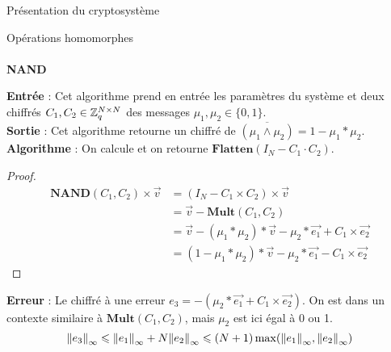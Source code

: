 \begin{section}{Présentation du cryptosystème}
\begin{subsection}{Opérations homomorphes}
	\paragraph{}
	\textbf{NAND}
	\flushleft
	
	\textbf{Entrée} : Cet algorithme prend en entrée les paramètres du système et deux chiffrés $C_1, C_2 \in \mathbb{Z}_q^{N \times N}$ des messages $\mu_1, \mu_2 \in \{ 0,1\}$.\\
	\textbf{Sortie} : Cet algorithme retourne un chiffré de $\overline{(\mu_1 \land \mu_2)} = 1 - \mu_1 * \mu_2$. \\
	\textbf{Algorithme} : On calcule et on retourne $\textbf{Flatten}(I_N - C_1 \cdot C_2)$.
	\begin{proof}
	\begin{align*}
	\textbf{NAND}(C_1, C_2) \times \vec{v} &= (I_N - C_1 \times C_2) \times \vec{v} \\
	&= \vec{v} - \textbf{Mult}(C_1, C_2) \\
	&= \vec{v} - (\mu_1 * \mu_2) * \vec{v} - \mu_2 * \vec{e_1} + C_1 \times \vec{e_2} \\
	&= (1 - \mu_1 * \mu_2) * \vec{v} - \mu_2 * \vec{e_1} - C_1 \times \vec{e_2}
	\end{align*}
	\end{proof}
	\textbf{Erreur} : Le chiffré à une erreur 
	$e_3 = -(\mu_2 * \vec{e_1} + C_1 \times \vec{e_2})$. On est dans 
	un contexte similaire à $\textbf{Mult}(C_1, C_2)$, mais 
	$\mu_2$ est ici égal à 0 ou 1.
\[{\|e_3\|}_{\infty} \leqslant {\|e_1\|}_{\infty} + N {\|e_2\|}_{\infty} \leqslant (N+1) \max({\|e_1\|}_{\infty}, {\|e_2\|}_{\infty})\]
	\end{subsection}
\end{section}
